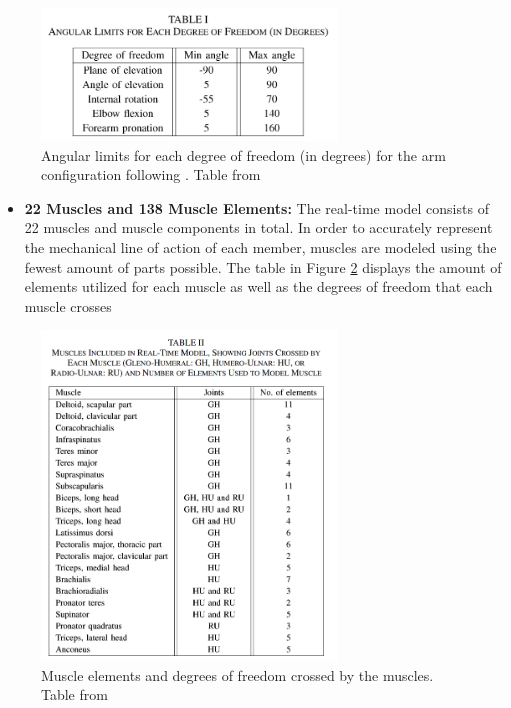 \begin{figure}[h!]
    \centering
    \includegraphics[width=0.7\textwidth]{Pictures/DAS/5dof.png}
    \caption{Angular limits for each degree of freedom (in degrees) for the arm configuration following \cite{ISB}. Table from \cite{RT3D}}
    \label{fig:5dof}
\end{figure}
\newpage
\begin{itemize}
    \item \textbf{22 Muscles and 138 Muscle Elements:} The real-time model consists of 22 muscles and muscle components in total. In order to accurately represent the mechanical line of action of each member, muscles are modeled using the fewest amount of parts possible. The table in Figure  \ref{fig:muscle_elements} displays the amount of elements utilized for each muscle as well as the degrees of freedom that each muscle crosses 
    
\end{itemize}

\begin{figure}[ht!]
    \centering
    \includegraphics[width=0.7\textwidth]{Pictures/DAS/muscles_elements.png}
    \caption{Muscle elements and degrees of freedom crossed by the muscles. Table from \cite{RT3D}}
    \label{fig:muscle_elements}
\end{figure}


